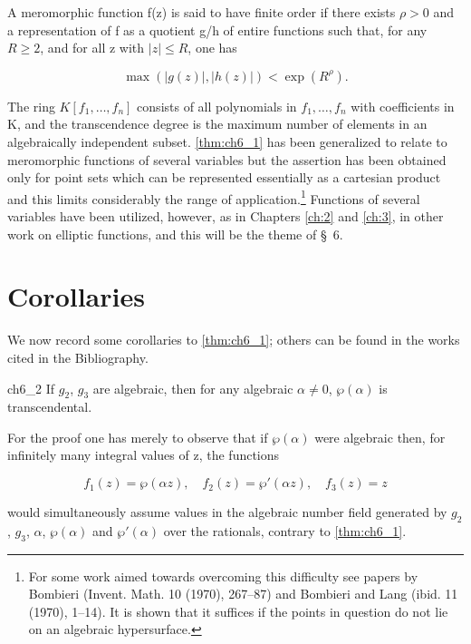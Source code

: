 A meromorphic function f(z) is said to have finite order if there exists $\rho > 0$ and a representation of f as a quotient g/h of entire functions such that, for any $R \ge 2$, and for all z with $|z| \le R$, one has

\[\max(|g(z)|, |h(z)|) < \exp(R^{\rho}). \tag{1}\label{eq:ch6_1}\]

The ring $K[f_1,\dots,f_n]$ consists of all polynomials in $f_1,\dots,f_n$ with coefficients in K, and the transcendence degree is the maximum number of elements in an algebraically independent subset. \autoref{thm:ch6_1} has been generalized to relate to meromorphic functions of several variables but the assertion has been obtained only for point sets which can be represented essentially as a cartesian product and this limits considerably the range of application.\footnote{For some work aimed towards overcoming this difficulty see papers by Bombieri (Invent. Math. 10 (1970), 267--87) and Bombieri and Lang (ibid. 11 (1970), 1--14). It is shown that it suffices if the points in question do not lie on an algebraic hypersurface.} Functions of several variables have been utilized, however, as in Chapters \ref{ch:2} and \ref{ch:3}, in other work on elliptic functions, and this will be the theme of \S~6.

\section{Corollaries}

We now record some corollaries to \autoref{thm:ch6_1}; others can be found in the works cited in the Bibliography.

\begin{mythm}{}{ch6_2}
If $g_2$, $g_3$ are algebraic, then for any algebraic $\alpha \neq 0$, $\wp(\alpha)$ is transcendental.
\end{mythm}

For the proof one has merely to observe that if $\wp(\alpha)$ were algebraic then, for infinitely many integral values of z, the functions

\[f_1(z) = \wp(\alpha z), \quad f_2(z) = \wp'(\alpha z), \quad f_3(z) = z\]

would simultaneously assume values in the algebraic number field generated by $g_2$, $g_3$, $\alpha$, $\wp(\alpha)$ and $\wp'(\alpha)$ over the rationals, contrary to \autoref{thm:ch6_1}.


